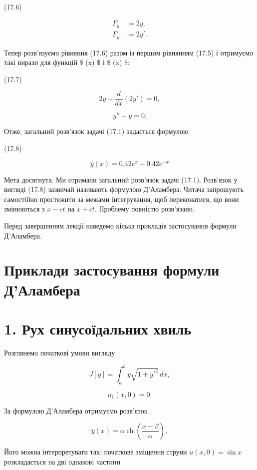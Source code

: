 \documentclass[
  ukrainian,
]{article}
\begin{document}
(17.6)

\[
\begin{aligned}
F_y &= 2y, \\
F_{y'} &= 2y'.
\end{aligned}
\]

Тепер розв'язуємо рівняння (17.6) разом із першим рівнянням (17.5) і
отримуємо такі вирази для функцій \$ \varphi(x) \$ і \$ \psi(x) \$:

(17.7)

\[
2y - \frac{d}{dx}(2y') = 0,
\]

\[
y'' - y = 0.
\]

Отже, загальний розв'язок задачі (17.1) задається формулою

(17.8)

\[
\overline{y}(x) = 0.42e^x - 0.42e^{-x}
\]

Мета досягнута. Ми отримали загальний розв'язок задачі (17.1). Розв'язок
у вигляді (17.8) зазвичай називають формулою Д'Аламбера. Читача
запрошують самостійно простежити за межами інтегрування, щоб
переконатися, що вони змінюються з \(x-ct\) на \(x+ct\). Проблему
повністю розв'язано.

Перед завершенням лекції наведемо кілька прикладів застосування формули
Д'Аламбера.

\section{Приклади застосування формули
Д'Аламбера}\label{ux43fux440ux438ux43aux43bux430ux434ux438-ux437ux430ux441ux442ux43eux441ux443ux432ux430ux43dux43dux44f-ux444ux43eux440ux43cux443ux43bux438-ux434ux430ux43bux430ux43cux431ux435ux440ux430}

\section{1. Рух синусоїдальних
хвиль}\label{ux440ux443ux445-ux441ux438ux43dux443ux441ux43eux457ux434ux430ux43bux44cux43dux438ux445-ux445ux432ux438ux43bux44c}

Розглянемо початкові умови вигляду

\[
J[y] = \int_a^b y \sqrt{1 + y'^2} \, dx,
\]

\[
u_1(x, 0) = 0.
\]

За формулою Д'Аламбера отримуємо розв'язок

\[
\overline{y}(x) = \alpha \operatorname{ch}\left(\frac{x - \beta}{\alpha}\right),
\]

Його можна інтерпретувати так: початкове зміщення струни
\(u(x, 0) = \sin x\) розкладається на дві однакові частини
\end{document}
